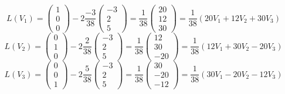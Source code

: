 \documentclass[12pt]{article}
\begin{document}
\begin{itemize}
          \[
              L(V_1) = \begin{pmatrix} 1 \\ 0 \\ 0 \end{pmatrix} - 2\dfrac{-3}{38}\begin{pmatrix} -3 \\ 2 \\ 5 \end{pmatrix}
              = \dfrac{1}{38}\begin{pmatrix} 20 \\ 12 \\ 30 \end{pmatrix}
              = \dfrac{1}{38}(20V_1 + 12V_2 + 30V_3)
          \]
          \[
              L(V_2) = \begin{pmatrix} 0 \\ 1 \\ 0 \end{pmatrix} - 2\dfrac{2}{38}\begin{pmatrix} -3 \\ 2 \\ 5 \end{pmatrix}
              = \dfrac{1}{38}\begin{pmatrix} 12 \\ 30 \\ -20 \end{pmatrix}
              = \dfrac{1}{38}(12V_1 + 30V_2 - 20V_3)
          \]
          \[
              L(V_3) = \begin{pmatrix} 0 \\ 0 \\ 1 \end{pmatrix} - 2\dfrac{5}{38}\begin{pmatrix} -3 \\ 2 \\ 5 \end{pmatrix}
              = \dfrac{1}{38}\begin{pmatrix} 30 \\ -20 \\ -12 \end{pmatrix}
              = \dfrac{1}{38}(30V_1 - 20V_2 - 12V_3)
          \]

\end{itemize}
\end{document}
